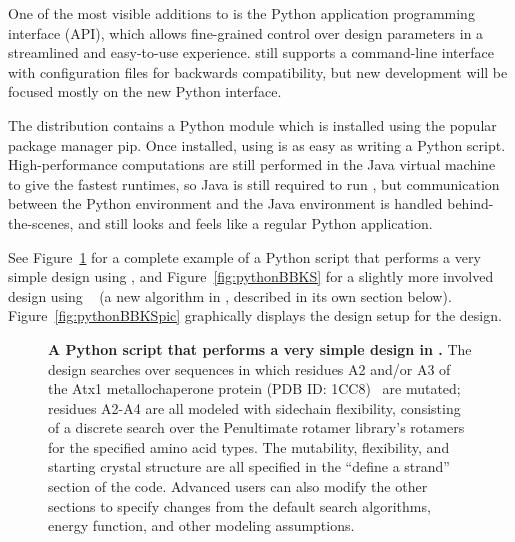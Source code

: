 
One of the most visible additions to  is the Python application programming interface (API), which allows fine-grained control over design parameters in a streamlined and easy-to-use experience.  still supports a command-line interface with configuration files for backwards compatibility, but new development will be focused mostly on the new Python interface. %

The  distribution contains a Python module which is installed using the popular package manager {\sc pip}. Once installed, using  is as easy as writing a Python script. High-performance computations are still performed in the Java virtual machine to give the fastest runtimes, so Java is still required to run , but communication between the Python environment and the Java environment is handled behind-the-scenes, and  still looks and feels like a regular Python application.

See Figure~\ref{fig:pythonGMEC} for a complete example of a Python script that performs a very simple design using , and Figure~\ref{fig:pythonBBKS} for a slightly more involved design using \bbks~\cite{BBK*} (a new algorithm in , described in its own section below).  Figure~\ref{fig:pythonBBKSpic} graphically displays the design setup for the \bbks design.  

\begin{figure}
\vspace{-0.7in}
{
	
}
\caption{\textbf{A Python script that performs a very simple design in .}  The design searches over sequences in which residues A2 and/or A3 of the Atx1 metallochaperone protein (PDB ID: 1CC8)~\cite{1CC8} are mutated; residues A2-A4 are all modeled with sidechain flexibility, consisting of a discrete search over the Penultimate rotamer library\cite{penultimate}'s rotamers for the specified amino acid types.  The mutability, flexibility, and starting crystal structure are all specified in the ``define a strand'' section of the code.  Advanced users can also modify the other sections to specify changes from the default search algorithms, energy function, and other modeling assumptions.  }
\label{fig:pythonGMEC}
\end{figure}


